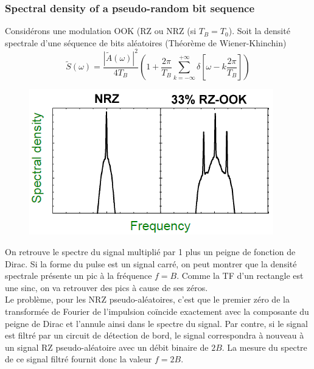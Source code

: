 \subsubsection{Spectral density of a pseudo-random bit sequence}
Considérons une modulation OOK (RZ ou NRZ (si $T_B=T_0$). Soit la densité spectrale d'une séquence 
de bits aléatoires (Théorème de Wiener-Khinchin)
\begin{equation}
\tilde S(\omega ) = \frac{{{{\left| {\tilde A(\omega )} \right|}^2}}}{{4{T_B}}}(1 + \frac{{2\pi }}{{{T_B}}}\sum\limits_{k =  - \infty }^{ + \infty } {\delta [\omega  - k\frac{{2\pi }}{{{T_B}}}]} )
\end{equation}

\newpage
\begin{figure}
\includegraphics[scale=0.65]{ch5/image11}
\end{figure}
On retrouve le spectre du signal multiplié par 1 plus un peigne de fonction de Dirac. Si la forme
du pulse est un signal carré, on peut montrer que la densité spectrale présente un pic à la fréquence
$f=B$. Comme la TF d'un rectangle est une sinc, on va retrouver des pics à cause de ses zéros. \\

Le problème, pour les NRZ pseudo-aléatoires, c'est que le premier zéro de la transformée de Fourier 
de l'impulsion coïncide exactement avec la composante du peigne de Dirac et l'annule ainsi dans le
spectre du signal. Par contre, si le signal est filtré par un circuit de détection de bord, le signal correspondra à nouveau à un signal RZ pseudo-aléatoire avec un débit binaire de $2B$. La mesure du spectre de ce signal filtré fournit donc la valeur $f = 2B$.

